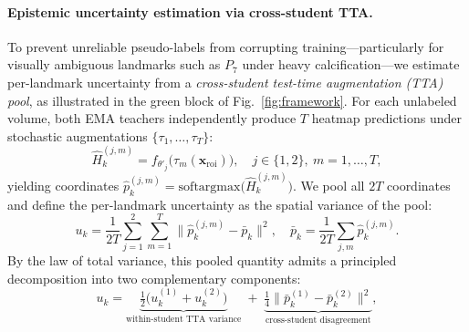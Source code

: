 \documentclass[conference]{IEEEtran}
\begin{document}
\paragraph{Epistemic uncertainty estimation via cross-student TTA.}
To prevent unreliable pseudo-labels from corrupting training---particularly for visually ambiguous landmarks such as $P_7$ under heavy calcification---we estimate per-landmark uncertainty from a \emph{cross-student test-time augmentation (TTA) pool}, as illustrated in the green block of Fig.~\ref{fig:framework}. For each unlabeled volume, both EMA teachers independently produce $T$ heatmap predictions under stochastic augmentations $\{\tau_1, \ldots, \tau_T\}$:
\begin{equation}
  \hat{H}_k^{(j,m)} = f_{\theta'_j}\!\bigl(\tau_m(\mathbf{x}_{\mathrm{roi}})\bigr), \quad j\in\{1,2\},\ m = 1, \ldots, T,
  \label{eq:tta_heatmaps}
\end{equation}
yielding coordinates $\hat{p}_k^{(j,m)} = \mathrm{softargmax}\bigl(\hat{H}_k^{(j,m)}\bigr)$. We pool all $2T$ coordinates and define the per-landmark uncertainty as the spatial variance of the pool:
\begin{equation}
  u_k = \frac{1}{2T}\sum_{j=1}^{2}\sum_{m=1}^{T}\bigl\|\hat{p}_k^{(j,m)} - \bar{p}_k\bigr\|^2,
  \quad \bar{p}_k = \frac{1}{2T}\sum_{j,m}\hat{p}_k^{(j,m)}.
  \label{eq:uncertainty}
\end{equation}
By the law of total variance, this pooled quantity admits a principled decomposition into two complementary components:
\begin{equation}
  u_k = \underbrace{\tfrac{1}{2}\!\bigl(u_k^{(1)} + u_k^{(2)}\bigr)}_{\text{within-student TTA variance}}
    \;+\;\underbrace{\tfrac{1}{4}\!\bigl\|\bar{p}_k^{(1)} - \bar{p}_k^{(2)}\bigr\|^2}_{\text{cross-student disagreement}},
  \label{eq:uncertainty_decomp}
\end{equation}
\end{document}
